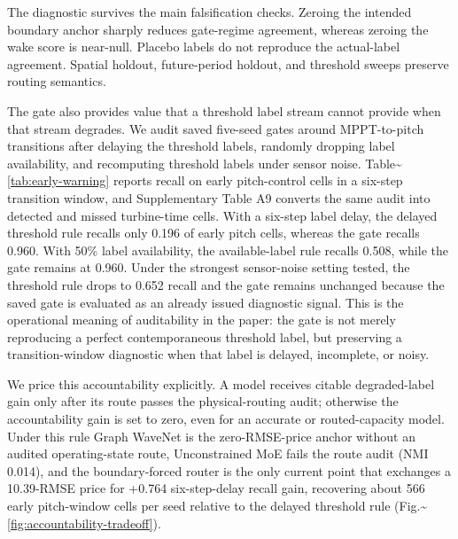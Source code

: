 \documentclass[
  11pt]{article}
\begin{document}
The diagnostic survives the main falsification checks. Zeroing the
intended boundary anchor sharply reduces gate-regime agreement, whereas
zeroing the wake score is near-null. Placebo labels do not reproduce the
actual-label agreement. Spatial holdout, future-period holdout, and
threshold sweeps preserve routing semantics.

The gate also provides value that a threshold label stream cannot
provide when that stream degrades. We audit saved five-seed gates around
MPPT-to-pitch transitions after delaying the threshold labels, randomly
dropping label availability, and recomputing threshold labels under
sensor noise. Table\textasciitilde{}\ref{tab:early-warning} reports
recall on early pitch-control cells in a six-step transition window, and
Supplementary Table A9 converts the same audit into detected and missed
turbine-time cells. With a six-step label delay, the delayed threshold
rule recalls only 0.196 of early pitch cells, whereas the gate recalls
0.960. With 50\% label availability, the available-label rule recalls
0.508, while the gate remains at 0.960. Under the strongest sensor-noise
setting tested, the threshold rule drops to 0.652 recall and the gate
remains unchanged because the saved gate is evaluated as an already
issued diagnostic signal. This is the operational meaning of
auditability in the paper: the gate is not merely reproducing a perfect
contemporaneous threshold label, but preserving a transition-window
diagnostic when that label is delayed, incomplete, or noisy.

We price this accountability explicitly. A model receives citable
degraded-label gain only after its route passes the physical-routing
audit; otherwise the accountability gain is set to zero, even for an
accurate or routed-capacity model. Under this rule Graph WaveNet is the
zero-RMSE-price anchor without an audited operating-state route,
Unconstrained MoE fails the route audit (NMI 0.014), and the
boundary-forced router is the only current point that exchanges a
10.39-RMSE price for +0.764 six-step-delay recall gain, recovering about
566 early pitch-window cells per seed relative to the delayed threshold
rule (Fig.\textasciitilde{}\ref{fig:accountability-tradeoff}).
\end{document}
